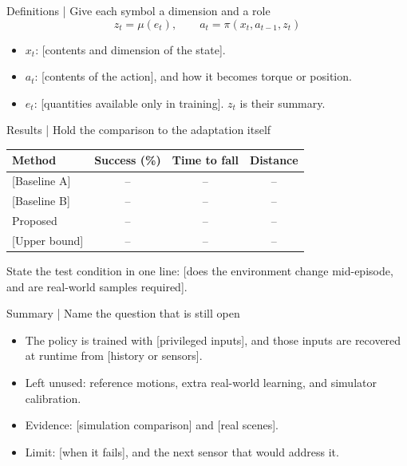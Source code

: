 \documentclass[aspectratio=169,10pt,t]{beamer}
\begin{document}
\begin{frame}{Definitions | Give each symbol a dimension and a role}
  \[
    z_t = \mu(e_t), \qquad a_t = \pi(x_t, a_{t-1}, z_t)
  \]

  \begin{itemize}
    \item $x_t$: [contents and dimension of the state].
    \item $a_t$: [contents of the action], and how it becomes torque or position.
    \item $e_t$: [quantities available only in training]. $z_t$ is their summary.
  \end{itemize}

\end{frame}

\begin{frame}{Results | Hold the comparison to the adaptation itself}
  \vspace{0.4em}
  \centering
  {\footnotesize
  \begin{tabular}{lccc}
    \toprule
    Method & Success (\%) & Time to fall & Distance \\
    \midrule
    {[Baseline A]} & -- & -- & -- \\
    {[Baseline B]} & -- & -- & -- \\
    Proposed & -- & -- & -- \\
    \midrule
    {[Upper bound]} & -- & -- & -- \\
    \bottomrule
  \end{tabular}}

  \vspace{0.8em}
  \raggedright
  State the test condition in one line: [does the environment change mid-episode, and are real-world samples required].

\end{frame}

\begin{frame}{Summary | Name the question that is still open}
  \begin{itemize}
    \item The policy is trained with [privileged inputs], and those inputs are recovered at runtime from [history or sensors].
    \item Left unused: reference motions, extra real-world learning, and simulator calibration.
    \item Evidence: [simulation comparison] and [real scenes].
    \item Limit: [when it fails], and the next sensor that would address it.
  \end{itemize}

\end{frame}
\end{document}
